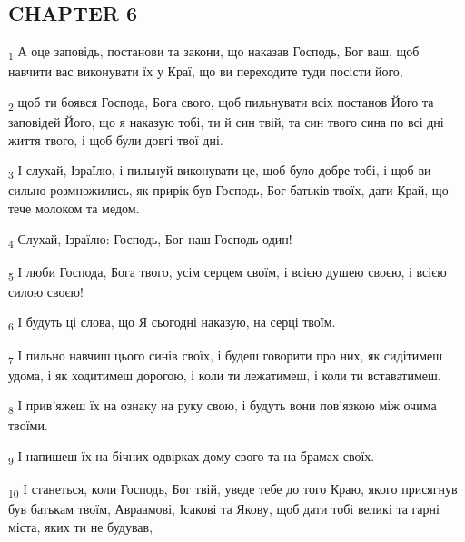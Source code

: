 \subsection{CHAPTER 6}
\begin{tcolorbox}
\textsubscript{1} А оце заповідь, постанови та закони, що наказав Господь, Бог ваш, щоб навчити вас виконувати їх у Краї, що ви переходите туди посісти його,
\end{tcolorbox}
\begin{tcolorbox}
\textsubscript{2} щоб ти боявся Господа, Бога свого, щоб пильнувати всіх постанов Його та заповідей Його, що я наказую тобі, ти й син твій, та син твого сина по всі дні життя твого, і щоб були довгі твої дні.
\end{tcolorbox}
\begin{tcolorbox}
\textsubscript{3} І слухай, Ізраїлю, і пильнуй виконувати це, щоб було добре тобі, і щоб ви сильно розмножились, як прирік був Господь, Бог батьків твоїх, дати Край, що тече молоком та медом.
\end{tcolorbox}
\begin{tcolorbox}
\textsubscript{4} Слухай, Ізраїлю: Господь, Бог наш Господь один!
\end{tcolorbox}
\begin{tcolorbox}
\textsubscript{5} І люби Господа, Бога твого, усім серцем своїм, і всією душею своєю, і всією силою своєю!
\end{tcolorbox}
\begin{tcolorbox}
\textsubscript{6} І будуть ці слова, що Я сьогодні наказую, на серці твоїм.
\end{tcolorbox}
\begin{tcolorbox}
\textsubscript{7} І пильно навчиш цього синів своїх, і будеш говорити про них, як сидітимеш удома, і як ходитимеш дорогою, і коли ти лежатимеш, і коли ти вставатимеш.
\end{tcolorbox}
\begin{tcolorbox}
\textsubscript{8} І прив'яжеш їх на ознаку на руку свою, і будуть вони пов'язкою між очима твоїми.
\end{tcolorbox}
\begin{tcolorbox}
\textsubscript{9} І напишеш їх на бічних одвірках дому свого та на брамах своїх.
\end{tcolorbox}
\begin{tcolorbox}
\textsubscript{10} І станеться, коли Господь, Бог твій, уведе тебе до того Краю, якого присягнув був батькам твоїм, Авраамові, Ісакові та Якову, щоб дати тобі великі та гарні міста, яких ти не будував,
\end{tcolorbox}
